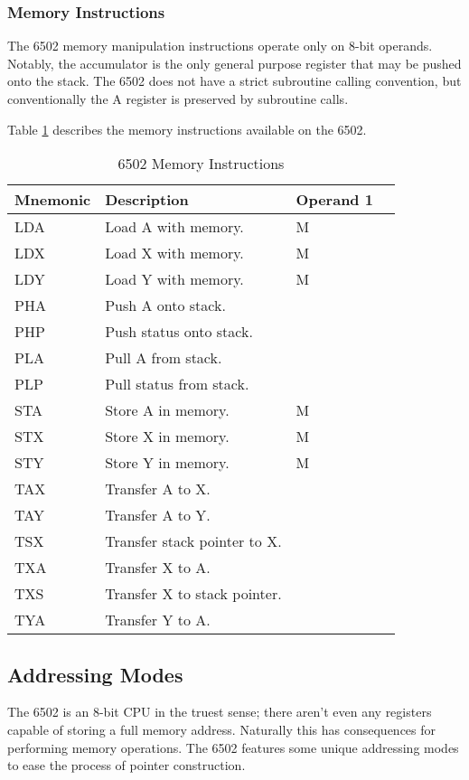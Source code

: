\documentclass[journal]{IEEEtran}
\begin{document}
\subsubsection{Memory Instructions}

The 6502 memory manipulation instructions operate only on 8-bit operands.
Notably, the accumulator is the only general purpose register that may be pushed
onto the stack. The 6502 does not have a strict subroutine calling convention,
but conventionally the A register is preserved by subroutine calls.

Table \ref{mem} describes the memory instructions available on the 6502.

\begin{table}
\centering
\begin{tabular}[H!]{|l|l|l|l|}
\hline
\textbf{Mnemonic} & \textbf{Description} & \textbf{Operand 1} \\
\hline
LDA & Load A with memory. & M \\
LDX & Load X with memory. & M \\
LDY & Load Y with memory. & M \\
PHA & Push A onto stack. & \\
PHP & Push status onto stack. & \\
PLA & Pull A from stack. & \\
PLP & Pull status from stack. & \\
STA & Store A in memory. & M \\
STX & Store X in memory. & M \\
STY & Store Y in memory. & M \\
TAX & Transfer A to X. & \\
TAY & Transfer A to Y. & \\
TSX & Transfer stack pointer to X. & \\
TXA & Transfer X to A. & \\
TXS & Transfer X to stack pointer. & \\
TYA & Transfer Y to A. & \\
\hline
\end{tabular}
\caption{6502 Memory Instructions}
\label{mem}
\end{table}

\subsection{Addressing Modes}

The 6502 is an 8-bit CPU in the truest sense; there aren't even any registers
capable of storing a full memory address. Naturally this has consequences for
performing memory operations. The 6502 features some unique addressing modes to
ease the process of pointer construction.
\end{document}
